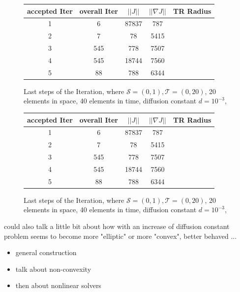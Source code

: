 \documentclass[../draft_1.tex]{subfiles}
\begin{document}
\begin{figure}
\begin{center}
	\begin{tabular}{||c | c | c | c | c ||} 
		\hline
		accepted Iter & overall Iter & $ || J || $ & $|| \nabla J ||$ & TR Radius \\ [0.5ex] 
		\hline\hline
		1 & 6 & 87837 & 787 & \\ 
		\hline
		2 & 7 & 78 & 5415 & \\
		\hline
		3 & 545 & 778 & 7507 & \\
		\hline
		4 & 545 & 18744 & 7560 & \\
		\hline
		5 & 88 & 788 & 6344 & \\ [1ex] 
		\hline
	\end{tabular}
\end{center}
\caption{Last steps of the Iteration, where $\mathcal{S} = (0, 1), \mathcal{T} = (0, 20)$, 20 elements in space, 40 elements in time, diffusion constant $d=10^{-3}$, }
\end{figure}

\begin{figure}
	\begin{center}
		\begin{tabular}{||c | c | c | c | c ||} 
			\hline
			accepted Iter & overall Iter & $ || J || $ & $|| \nabla J ||$ & TR Radius \\ [0.5ex] 
			\hline\hline
			1 & 6 & 87837 & 787 & \\ 
			\hline
			2 & 7 & 78 & 5415 & \\
			\hline
			3 & 545 & 778 & 7507 & \\
			\hline
			4 & 545 & 18744 & 7560 & \\
			\hline
			5 & 88 & 788 & 6344 & \\ [1ex] 
			\hline
		\end{tabular}
	\end{center}
	\caption{Last steps of the Iteration, where $\mathcal{S} = (0, 1), \mathcal{T} = (0, 20)$, 20 elements in space, 40 elements in time, diffusion constant $d=10^{-3}$, }
\end{figure}

could also talk a little bit about how with an increase of diffusion constant problem seems to become more "elliptic" or more "convex", better behaved ... 
\begin{itemize}
	\item general construction
	\item talk about non-convexity 
	\item then about nonlinear solvers
	
\end{itemize}
\end{document}
